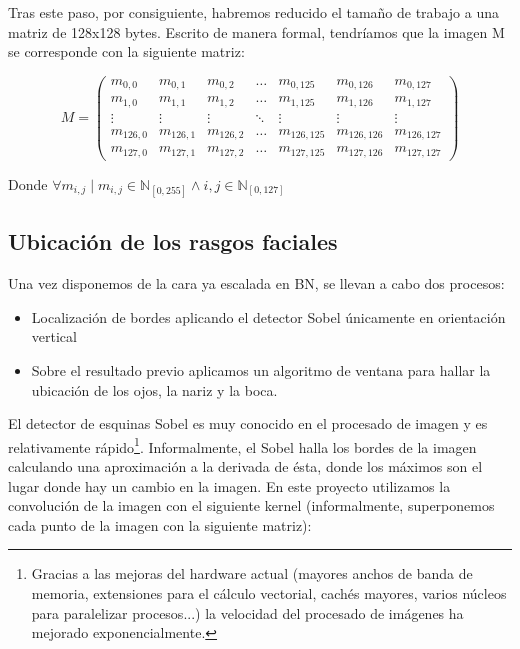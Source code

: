 Tras este paso, por consiguiente, habremos reducido el tamaño de trabajo a una matriz de 128x128 bytes. Escrito de manera formal, tendríamos que la imagen M se corresponde con la siguiente matriz:

\[ M=\left( \begin{array}{lcccccr} 
	m_{0,0} & m_{0,1} & m_{0,2} & \hdots & m_{0,125} & m_{0,126} & m_{0,127}\\
	m_{1,0} & m_{1,1} & m_{1,2} & \hdots & m_{1,125} & m_{1,126} & m_{1,127}\\
	\vdots & \vdots & \vdots & \ddots & \vdots & \vdots & \vdots \\
	m_{126,0} & m_{126,1} & m_{126,2} & \hdots & m_{126,125} & m_{126,126} & m_{126,127}\\
	m_{127,0} & m_{127,1} & m_{127,2} & \hdots & m_{127,125} & m_{127,126} & m_{127,127}
	\end{array} \right)
\]

Donde $ \forall m_{i,j} \mid m_{i,j} \in \mathbb{N}_{\left[ 0,255 \right]} \wedge i,j \in \mathbb{N}_{\left[ 0,127 \right]} $
	

\subsection{Ubicación de los rasgos faciales}
Una vez disponemos de la cara ya escalada en BN, se llevan a cabo dos procesos:
\begin{itemize}
	\item{Localización de bordes aplicando el detector Sobel únicamente en orientación vertical}
	\item{Sobre el resultado previo aplicamos un algoritmo de ventana para hallar la ubicación de los ojos, la nariz y la boca.}
\end{itemize}

El detector de esquinas Sobel es muy conocido en el procesado de imagen y es relativamente rápido\footnote{Gracias a las mejoras del hardware actual (mayores anchos de banda de memoria, extensiones para el cálculo vectorial, cachés mayores, varios núcleos para paralelizar procesos...) la velocidad del procesado de imágenes ha mejorado exponencialmente. }. Informalmente, el Sobel halla los bordes de la imagen calculando una aproximación a la derivada de ésta, donde los máximos son el lugar donde hay un cambio en la imagen. En este proyecto utilizamos la convolución de la imagen con el siguiente kernel (informalmente, superponemos cada punto de la imagen con la siguiente matriz):

